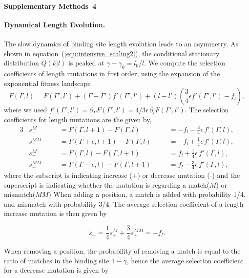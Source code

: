 \documentclass[10pt,a4paper]{article}
\begin{document}
\clearpage
\paragraph*{Supplementary Methods~4} \label{supp4}
{\bf{Dynamical Length Evolution.}}\\ \\

\noindent The slow dynamics of binding site length evolution leads to an asymmetry. As shown in equation~(\ref{equ:intensive_scaling2}), the conditional stationary distribution $Q(k|l)$ is peaked at $\gamma-\gamma_0=l_0/l$. We compute the selection coefficients of length mutations in first order, using the expansion of the exponential fitness landscape
\begin{equation}
	F(\Gamma, l) = F(\Gamma', l') + (\Gamma-\Gamma') f'(\Gamma', l') + (l-l') \left(\frac{3}{4}\epsilon f'(\Gamma', l') - f_l\right),
\end{equation}
where we used $f'(\Gamma', l') = \partial_\Gamma F(\Gamma', l') = 4/3\epsilon \,\partial_l F(\Gamma', l')$.
The selection coefficients for length mutations are the given by,
\begin{alignat}{3}
	& s_+^M    \quad && = F(\Gamma, l+1) - F(\Gamma, l)          \quad && = -f_l - \frac{3}{4}\epsilon\,f'(\Gamma, l),\\
	& s_+^{MM} \quad && = F(\Gamma+\epsilon, l+1) - F(\Gamma, l) \quad && = -f_l + \frac{1}{4}\epsilon\,f'(\Gamma, l),\\
	& s_-^M    \quad && = F(\Gamma, l) - F(\Gamma, l+1)          \quad && = f_l + \frac{1}{4}\epsilon\,f'(\Gamma, l),\\
	& s_-^{MM} \quad && = F(\Gamma-\epsilon, l) - F(\Gamma, l+1) \quad && = f_l - \frac{3}{4}\epsilon\,f'(\Gamma, l),
\end{alignat}
where the subscript is indicating increase (+) or decrease mutation (-) and the superscript is indicating whether the mutation is regarding a match($M$) or mismatch($MM$)
When adding a position, a match is added with probability 1/4, and mismatch with probability 3/4. The average selection coefficient of a length increase mutation is then given by

\begin{equation}
	\bar s_+ = \frac{1}{4} s_+^M + \frac{3}{4} s_+^{MM} = -f_l.
\end{equation}

\noindent When removing a position, the probability of removing a match is equal to the ratio of matches in the binding site $1-\gamma$, hence the average selection coefficient for a decrease mutation is given by 
\end{document}
